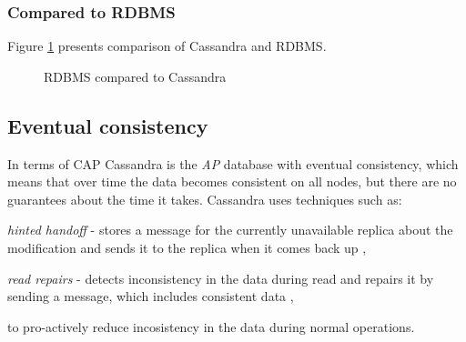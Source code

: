 \subsubsection{Compared to RDBMS}
Figure \ref{fig:cassandraToRdbms} presents comparison of Cassandra and RDBMS.
\begin{figure}[H]
  \setlength{\unitlength}{1.3cm}  
  \caption{RDBMS compared to Cassandra}
  \label{fig:cassandraToRdbms}
\end{figure}

\subsection{Eventual consistency}\label{sec:theory:eventualConsistency}
In terms of CAP \cite{brewer2000towards} \cite{Brewer:2012ba} Cassandra is the \emph{AP} database with eventual consistency, which means that over time the data becomes consistent on all nodes, but there are no guarantees about the time it takes. Cassandra uses techniques such as: \begin{enumerate*} 
\item \emph{hinted handoff} - stores a message for the currently unavailable replica about the modification and sends it to the replica when it comes back up \cite{CassandraHintedHandoff},  
\item \emph{read repairs} - detects inconsistency in the data during read and repairs it by sending a message, which includes consistent data \cite{CassandraReadRepair},  \end{enumerate*} to pro-actively reduce incosistency in the data during normal operations.